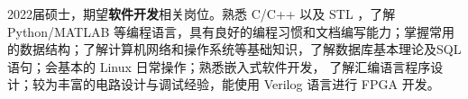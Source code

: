{\onehalfspacing\hspace{2em}%
2022届硕士，期望\textbf{软件开发}相关岗位。熟悉 C/C++ 以及 STL ，了解 Python/MATLAB 等编程语言，具有良好的编程习惯和文档编写能力；掌握常用的数据结构；了解计算机网络和操作系统等基础知识，了解数据库基本理论及SQL语句；会基本的 Linux 日常操作；熟悉嵌入式软件开发， 了解汇编语言程序设计；较为丰富的电路设计与调试经验，能使用 Verilog 语言进行 FPGA 开发。
\par}
